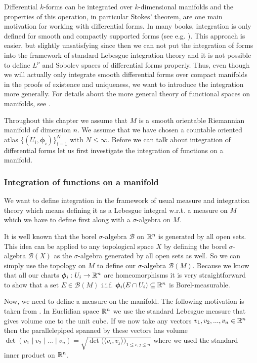 \documentclass[../master_thesis.tex]{subfiles}
\begin{document}
Differential $k$-forms can be integrated over $k$-dimensional manifolds and 
the properties of this operation, in particular Stokes' theorem, are one main motivation for working with differential 
forms. In many books, integration is only defined for 
smooth and compactly supported forms (see e.g. \cite[Sec.\,V.3]{topology_and_geometry}). This approach is easier, 
but slightly unsatisfying since then we can not put the integration of forms 
into the framework of standard Lebesgue integration theory and it is not possible 
to define $L^p$ and Sobolev spaces of differential forms properly. Thus, even though we will
actually only integrate smooth differential forms over compact manifolds in the proofs
of existence and uniqueness,
we want to introduce the integration more generally. For details about the 
more general theory of functional spaces on manifolds, see \cite[Sec.\,10.2.4]{nicolaescu}.

Throughout this chapter we assume that $M$ is a smooth orientable Riemannian 
manifold of dimension $n$. We assume that we have chosen a 
countable oriented atlas $\{ (U_i, \boldsymbol{\phi}_i) \}_{i=1}^N$ with $N \leq \infty$. 
Before we can talk about integration of differential forms let us first 
investigate the integration of functions on a manifold.

\subsubsection{Integration of functions on a manifold}

We want to define integration in the framework of usual measure and integration
theory which means defining it as a Lebesgue integral w.r.t. a measure on $M$
which we have to define first along with a $\sigma$-algebra on $M$. 

It is well known that
the borel $\sigma$-algebra $\mathcal{B}$ on $\mathbb{R}^n$ is generated
by all open sets. This idea can be applied to any topological space $X$ by 
defining the borel $\sigma$-algebra $\mathcal{B}(X)$ as the $\sigma$-algebra 
generated by all open sets as well. So we can simply use the topology on $M$ to define 
our $\sigma$-algebra $\mathcal{B}(M)$. Because we know that all our 
charts $\boldsymbol{\phi}_i: U_i \rightarrow \mathbb{R}^n$ are homeomorphisms it is very 
straightforward to show that a set $E \in \mathcal{B}(M)$ i.i.f.
$\boldsymbol{\phi}_i(E \cap U_i) \subseteq \mathbb{R}^n$ is Borel-measurable. 

Now, we need to define a measure on the manifold. 
The following motivation is taken from \cite[3.H.2]{gallot_hulin_lafontaine}.
In Euclidian space $\mathbb{R}^n$ we use the standard Lebesgue measure that gives 
volume one to the unit cube. If we now take any vectors $v_1, v_2, ..., v_n 
\in \mathbb{R}^n$ then the parallelepiped spanned by these vectors has 
volume $\det (v_1 \mid v_2 \mid \dots \mid v_n) 
= \sqrt{ \det \big( \langle v_i , v_j \rangle \big)_{1\leq i,j \leq n} }$ where 
we used the standard inner product on $\mathbb{R}^n$. 
\end{document}
